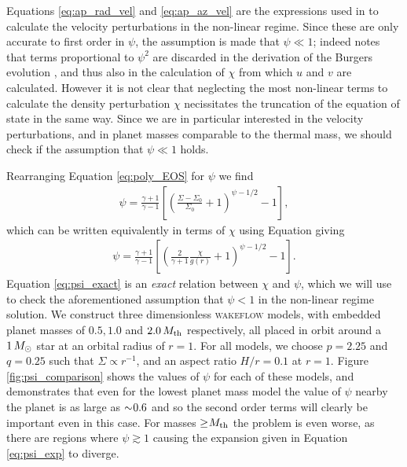 Equations \ref{eq:ap_rad_vel} and \ref{eq:ap_az_vel} are the expressions used in \citet{bollati2021} to calculate the velocity perturbations in the non-linear regime. Since these are only accurate to first order in $\psi$, the assumption is made that $\psi \ll 1$; indeed \citet{bollati2021} notes that terms proportional to $\psi^2$ are discarded in the derivation of the Burgers evolution \feqr, and thus also in the calculation of $\chi$ from which $u$ and $v$ are calculated. However it is not clear that neglecting the most non-linear terms to calculate the density perturbation $\chi$ necissitates the truncation of the equation of state in the same way. Since we are in particular interested in the velocity perturbations, and in planet masses comparable to the thermal mass, we should check if the assumption that $\psi \ll 1$ holds.

Rearranging Equation \ref{eq:poly_EOS} for $\psi$ we find
\begin{align}
    \psi = \frac{\gamma + 1}{\gamma - 1} \left[ \left( \frac{\Sigma-\Sigma_0}{\Sigma_0} +1  \right)^{\psi-1/2} -1 \right],
\end{align}
which can be written equivalently in terms of $\chi$ using Equation \feqr giving
\begin{align}
    \boxed{\psi = \frac{\gamma + 1}{\gamma - 1} \left[ \left( \frac{2}{\gamma + 1} \frac{\chi}{g(r)} +1  \right)^{\psi-1/2} -1 \right]}. \label{eq:psi_exact}
\end{align}
Equation \ref{eq:psi_exact} is an \textit{exact} relation between $\chi$ and $\psi$, which we will use to check the aforementioned assumption that $\psi<1$ in the non-linear regime solution. We construct three dimensionless \textsc{wakeflow} models, with embedded planet masses of $0.5, 1.0$ and $2.0 \, M_{\rm{th}}$ respectively, all placed in orbit around a $1 \, M_{\rm{\odot}}$ star at an orbital radius of $r=1$. For all models, we choose $p=2.25$ and $q=0.25$ such that $\Sigma \propto r^{-1}$, and an aspect ratio $H/r=0.1$ at $r=1$. Figure \ref{fig:psi_comparison} shows the values of $\psi$ for each of these models, and demonstrates that even for the lowest planet mass model the value of $\psi$ nearby the planet is as large as $\sim \hspace{-0.23em} 0.6$ and so the second order terms will clearly be important even in this case. For masses $\ge \hspace{-0.23em} M_\mathrm{th}$ the problem is even worse, as there are regions where $\psi \gtrsim 1$ causing the expansion given in Equation \ref{eq:psi_exp} to diverge.

